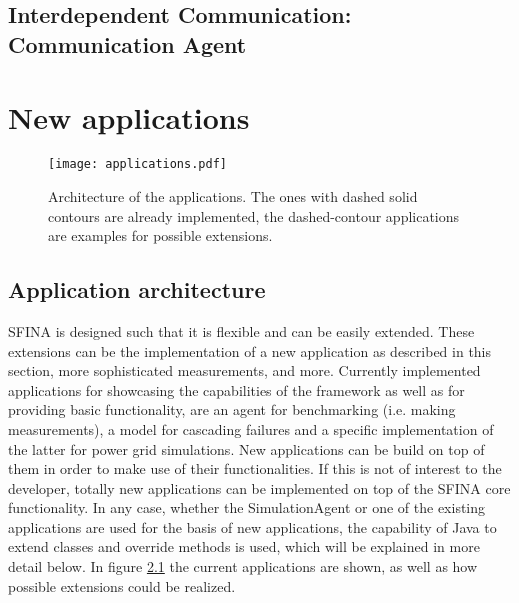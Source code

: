 \documentclass[11pt,fleqn]{book} %
\newcommand{\CommunicationAgent}{Communication Agent}
\begin{document}
\section{Interdependent Communication: \CommunicationAgent{}}



\chapter{New applications}
\label{ch:new_applications}

\begin{figure}[!ht]
\centering\texttt{[image: applications.pdf]}
\caption{Architecture of the applications. The ones with dashed solid contours are already implemented, the dashed-contour applications are examples for possible extensions.}
\label{fig:apps}
\end{figure}

\section{Application architecture}\label{sec:apps}
SFINA is designed such that it is flexible and can be easily extended. These extensions can be the implementation of a new application as described in this section, more sophisticated measurements, and more. Currently implemented applications for showcasing the capabilities of the framework as well as for providing basic functionality, are an agent for benchmarking (i.e. making measurements), a model for cascading failures and a specific implementation of the latter for power grid simulations. New applications can be build on top of them in order to make use of their functionalities. If this is not of interest to the developer, totally new applications can be implemented on top of the SFINA core functionality. In any case, whether the SimulationAgent or one of the existing applications are used for the basis of new applications, the capability of Java to extend classes and override methods is used, which will be explained in more detail below. In figure \ref{fig:apps} the current applications are shown, as well as how possible extensions could be realized.
\end{document}
